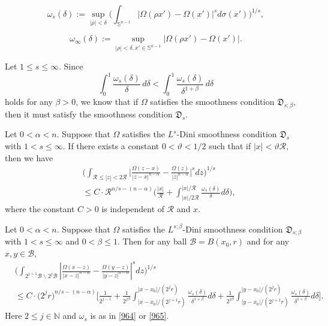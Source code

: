 \documentclass[10pt,a4paper]{amsart}
\begin{document}
\begin{equation}\label{964}
\omega_s(\delta):=\sup_{|\rho|<\delta}\bigg(\int_{\mathbb{S}^{n-1}}\big|\Omega(\rho x')-\Omega(x')\big|^sd\sigma(x')\bigg)^{1/s},
\end{equation}

\begin{equation}\label{965}
\omega_{\infty}(\delta):=\sup_{|\rho|<\delta,x'\in \mathbb{S}^{n-1}}\big|\Omega(\rho x')-\Omega(x')\big|.
\end{equation}

\begin{rem}\label{remark10}
Let $1\leq s\leq\infty$. Since
\begin{equation*}
\int_0^1\frac{\omega_s(\delta)}{\delta}\,d\delta<\int_0^1\frac{\omega_s(\delta)}{\delta^{1+\beta}}\,d\delta
\end{equation*}
holds for any $\beta>0$, we know that if $\Omega$ satisfies the smoothness condition $\mathfrak{D}_{s;\beta}$, then it must satisfy the smoothness condition $\mathfrak{D}_{s}$.
\end{rem}

\begin{lem}\label{lem1}
Let $0<\alpha<n$. Suppose that $\Omega$ satisfies the $L^s$-Dini smoothness condition $\mathfrak{D}_{s}$ with $1<s\le\infty$. If there exists a constant $0<\vartheta<1/2$ such that if $|x|<\vartheta \mathcal{R}$, then we have
\begin{equation*}
\begin{split}
&\bigg(\int_{\mathcal{R}\leq|z|<2\mathcal{R}}
\bigg|\frac{\Omega(z-x)}{|z-x|^{n-\alpha}}-\frac{\Omega(z)}{|z|^{n-\alpha}}\bigg|^sdz\bigg)^{1/s}\\
&\leq C\cdot \mathcal{R}^{n/s-(n-\alpha)}\bigg(\frac{|x|}{\mathcal{R}}
+\int_{|x|/{2\mathcal{R}}}^{|x|/\mathcal{R}}\frac{\omega_{s}(\delta)}{\delta}d\delta\bigg),
\end{split}
\end{equation*}
where the constant $C>0$ is independent of $\mathcal{R}$ and $x$.
\end{lem}

\begin{lem}\label{lem3}
Let $0<\alpha<n$. Suppose that $\Omega$ satisfies the $L^{s;\beta}$-Dini smoothness condition $\mathfrak{D}_{s;\beta}$ with $1<s\le\infty$ and $0<\beta\leq1$. Then for any ball $\mathcal{B}=B(x_0,r)$ and for any $x,y\in \mathcal{B}$,
\begin{equation}\label{wewant0}
\begin{split}
&\bigg(\int_{2^{j+1}\mathcal{B}\backslash 2^j\mathcal{B}}
\left|\frac{\Omega(x-z)}{|x-z|^{n-\alpha}}-\frac{\Omega(y-z)}{|y-z|^{n-\alpha}}\right|^sdz\bigg)^{1/s}\\
&\leq C\cdot\big(2^jr\big)^{n/s-(n-\alpha)}
\bigg[\frac{1}{2^{j-1}}+\frac{1}{2^{j\beta}}
\int_{|x-x_0|/{(2^{j+1}r)}}^{|x-x_0|/{(2^jr)}}\frac{\omega_s(\delta)}{\delta^{1+\beta}}d\delta
+\frac{1}{2^{j\beta}}
\int_{|y-x_0|/{(2^{j+1}r)}}^{|y-x_0|/{(2^jr)}}\frac{\omega_s(\delta)}{\delta^{1+\beta}}d\delta\bigg].
\end{split}
\end{equation}
Here $2\leq j\in \mathbb{N}$ and $\omega_s$ is as in \eqref{964} or \eqref{965}.
\end{lem}
\end{document}
